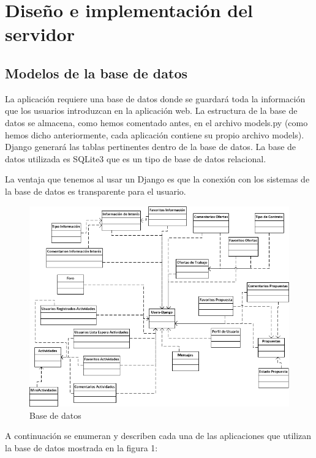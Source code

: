 \section{Diseño e implementación del servidor} 
\label{sec:servidor}


\subsection{Modelos de la base de datos} 
\label{subsec:modelos}


La aplicación requiere una base de datos donde se guardará toda la información que los usuarios introduzcan en la aplicación web. La estructura de la base de datos se almacena, como hemos comentado antes, en el archivo models.py (como hemos dicho anteriormente, cada aplicación contiene su propio archivo models). Django generará las tablas pertinentes dentro de la base de datos. La base de datos utilizada es SQLite3 que es un tipo de base de datos relacional.


La ventaja que tenemos al usar un Django es que la conexión con los sistemas de la base de datos es transparente para el usuario. 

 \begin{figure}[H]
    \centering
    \includegraphics[width=12cm]{img/bbdd}
    \caption{Base de datos}
    \label{figura:base_datos}
 \end{figure}

A continuación se enumeran y describen cada una de las aplicaciones que utilizan la base de datos mostrada en la figura 1:


